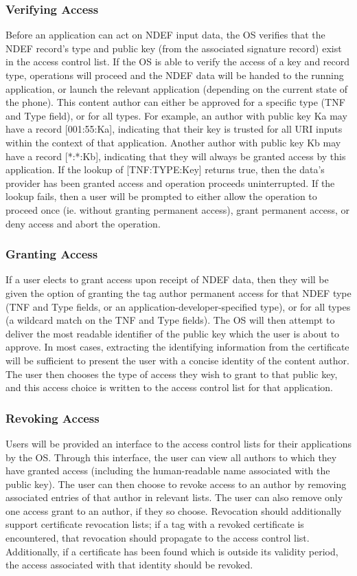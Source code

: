 \documentclass[12pt]{article}
\begin{document}
\subsubsection{Verifying Access}
Before an application can act on NDEF input data, the OS verifies that the NDEF record's type and public key (from the associated signature record) exist in the access control list.
If the OS is able to verify the access of a key and record type, operations will proceed and the NDEF data will be handed to the running application, or launch the relevant application (depending on the current state of the phone).
This content author can either be approved for a specific type (TNF and Type field), or for all types.
For example, an author with public key Ka may have a record [001:55:Ka], indicating that their key is trusted for all URI inputs within the context of that application.
Another author with public key Kb may have a record [*:*:Kb], indicating that they will always be granted access by this application.
If the lookup of [TNF:TYPE:Key] returns true, then the data's provider has been granted access and operation proceeds uninterrupted.
If the lookup fails, then a user will be prompted to either allow the operation to proceed once (ie. without granting permanent access), grant permanent access, or deny access and abort the operation.
\subsubsection{Granting Access}
If a user elects to grant access upon receipt of NDEF data, then they will be given the option of granting the tag author permanent access for that NDEF type (TNF and Type fields, or an application-developer-specified type), or for all types (a wildcard match on the TNF and Type fields).
The OS will then attempt to deliver the most readable identifier of the public key which the user is about to approve.
In most cases, extracting the identifying information from the certificate will be sufficient to present the user with a concise identity of the content author.
The user then chooses the type of access they wish to grant to that public key, and this access choice is written to the access control list for that application.
\subsubsection{Revoking Access}
Users will be provided an interface to the access control lists for their applications by the OS.
Through this interface, the user can view all authors to which they have granted access (including the human-readable name associated with the public key).
The user can then choose to revoke access to an author by removing associated entries of that author in relevant lists.
The user can also remove only one access grant to an author, if they so choose.
Revocation should additionally support certificate revocation lists; if a tag with a revoked certificate is encountered, that revocation should propagate to the access control list.
Additionally, if a certificate has been found which is outside its validity period, the access associated with that identity should be revoked.
\end{document}
